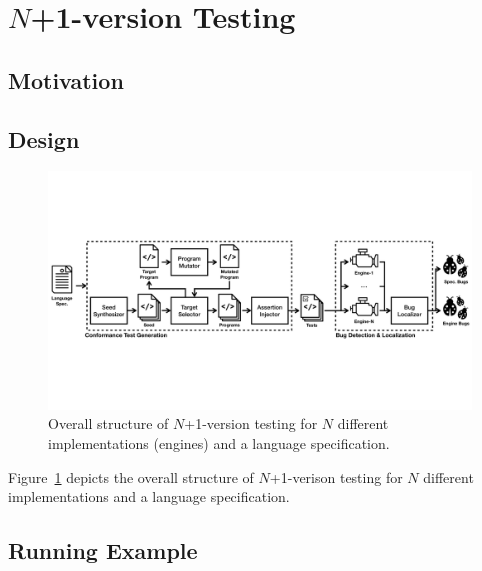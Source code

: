 \section{$N$+1-version Testing}\label{sec:idea}

\subsection{Motivation}


\subsection{Design}

\begin{figure}
  \centering
  \includegraphics[width=1\textwidth]{img/n+1-version-testing.pdf}
  \caption{Overall structure of $N$+1-version testing for $N$ different
    implementations (engines) and a language specification.}
  \label{fig:overall}
\vspace*{-1em}
\end{figure}

Figure~\ref{fig:overall} depicts the overall structure of $N$+1-verison testing
for $N$ different implementations and a language specification.


\subsection{Running Example}

